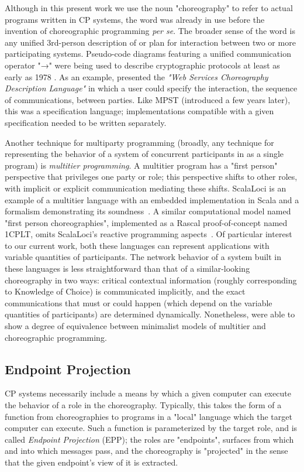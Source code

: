 Although in this present work we use the noun "choreography" to refer to actual programs written in CP systems,
the word was already in use before the invention of choreographic programming \textit{per se}.
The broader sense of the word is any unified 3rd-person description of or plan for interaction between two or more participating systems.
Pseudo-code diagrams featuring a unified communication operator "→"
were being used to describe cryptographic protocols at least as early as 1978 \cite{needham_schroeder_1978}.
As an example,
\cite{w3c2005} presented the \emph{"Web Services Choreography Description Language"}
in which a user could specify the interaction, the sequence of communications, between parties.
Like MPST (introduced a few years later),
this was a specification language; implementations compatible with a given specification needed to be written separately.

Another technique for multiparty programming
(broadly, any technique for representing the behavior of a system of concurrent participants in as a single program)
is \emph{multitier programming}.
A multitier program has a "first person" perspective that privileges one party or role;
this perspective shifts to other roles, with implicit or explicit communication mediating these shifts.
ScalaLoci is an example of a multitier language with an embedded implementation in Scala and a formalism demonstrating its soundness~\cite{scalaLoci}.
A similar computational model named "first person choreographies", implemented as a Rascal proof-of-concept named 1CPLT,
omits ScalaLoci's reactive programming aspects~\cite{jongmans1cp2025}.
Of particular interest to our current work, both these languages can represent applications with variable quantities of participants.
The network behavior of a system built in these languages is less straightforward than that of a similar-looking choreography in two ways:
critical contextual information (roughly corresponding to Knowledge of Choice) is communicated implicitly,
and the exact communications that must or could happen (which depend on the variable quantities of participants) are determined dynamically.
Nonetheless, \cite{multiparty-languages} were able to show a degree of equivalence between minimalist models of multitier and choreographic programming.

\subsection{Endpoint Projection}
\label{sec:endpoint-projection}
CP systems necessarily include a means by which a given computer can execute the behavior of a role in the choreography.
Typically, this takes the form of a function from choreographies to programs in a "local" language
which the target computer can execute.
Such a function is parameterized by the target role, and is called \emph{Endpoint Projection} (EPP);
the roles are "endpoints", \ie surfaces from which and into which messages pass,
and the choreography is "projected" in the sense that the given endpoint's view of it is extracted.

